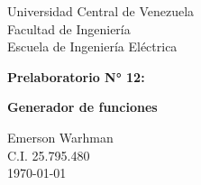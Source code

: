 \begin{titlepage}
    \centering
    \Large
    Universidad Central de Venezuela\\
    Facultad de Ingeniería\\
    Escuela de Ingeniería Eléctrica
    \vspace*{8cm}

    \Huge
    \textbf{Prelaboratorio N° 12: } 

    \textbf{Generador de funciones}
    \vfill


    \Large

    Emerson Warhman \\
    C.I. 25.795.480 \\
    \today

\end{titlepage}